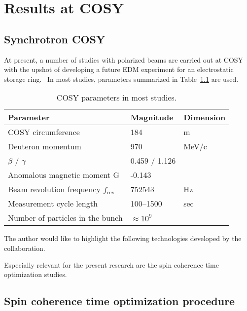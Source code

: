 \chapter{Results at COSY}\label{chpt4:top-level}

\section{Synchrotron COSY}


At present, a number of studies with polarized beams are carried out at COSY with the upshot of 
developing a future EDM experiment for an electrostatic storage ring.~\cite{Lehrach:Precursor2012, Lehrach:IPAC15, COSY:SpinTuneMapping, Eversmann:SpinTuneMeasurement, COSY:SCT:1000sec, Wagner:BBA2018}
In most studies, parameters summarized in Table~\ref{tbl:COSY-studies} are used.

\begin{table}[h]\centering
	\caption{COSY parameters in most studies.\label{tbl:COSY-studies}}
	\begin{tabular}{lll}
		\hline
		Parameter & Magnitude & Dimension \\
		\hline
		COSY circumference & 184 & m\\
		Deuteron momentum & 970 & MeV/c \\
		 $\beta$ / $\gamma$ & 0.459 / 1.126 & \\
		 Anomalous magnetic moment G& -0.143& \\
		 Beam revolution frequency $f_{\mathrm{rev}}$& 752543& Hz\\
		 Measurement cycle length& 100--1500& sec\\
		 Number of particles in the bunch & $\approx 10^9$& \\
		 \hline
	\end{tabular}
\end{table}

The author would like to highlight the following technologies developed by the collaboration.


Especially relevant for the present research are the spin coherence time optimization studies.
\section{Spin coherence time optimization procedure}\label{sec:COSY:SCT-optimization}



\clearpage
